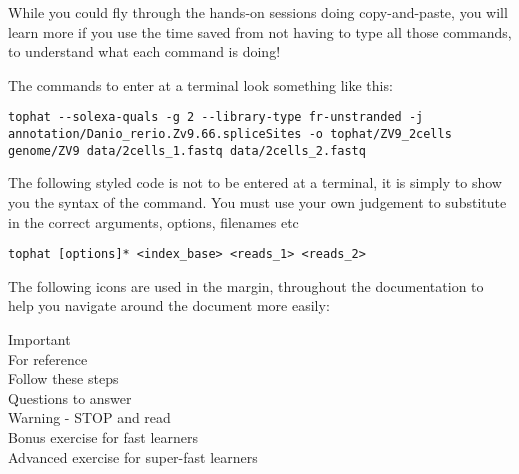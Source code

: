 \begin{warning}
While you could fly through the hands-on sessions doing copy-and-paste, you will learn more if you
use the time saved from not having to type all those commands, to understand what each command is
doing!
\end{warning}

The commands to enter at a terminal look something like this:
\begin{lstlisting}
tophat --solexa-quals -g 2 --library-type fr-unstranded -j annotation/Danio_rerio.Zv9.66.spliceSites -o tophat/ZV9_2cells genome/ZV9 data/2cells_1.fastq data/2cells_2.fastq
\end{lstlisting}  

The following styled code is not to be entered at a terminal, it is simply to show you the syntax of the command. 
You must use your own judgement to substitute in the correct arguments, options, filenames etc

\begin{lstlisting}[style=command_syntax]
tophat [options]* <index_base> <reads_1> <reads_2>
\end{lstlisting}



The following icons are used in the margin, throughout the documentation to help you navigate around
the document more easily:

\hspace*{.2cm} Important\\
\hspace*{.2cm} For reference\\
\hspace*{.2cm} Follow these steps\\
\hspace*{.2cm} Questions to answer\\
\hspace*{.2cm} Warning - STOP and read\\
\hspace*{.2cm} Bonus exercise for fast learners\\
\hspace*{.2cm} Advanced exercise for super-fast learners\\
